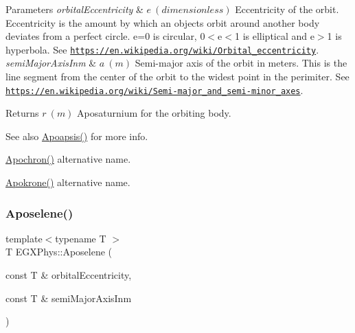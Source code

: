 \begin{DoxyParams}{Parameters}
{\em orbital\+Eccentricity} & $ e\ (dimensionless)$ Eccentricity of the orbit. Eccentricity is the amount by which an objects orbit around another body deviates from a perfect circle. e=0 is circular, 0$<$e$<$1 is elliptical and e$>$1 is hyperbola. See \href{https://en.wikipedia.org/wiki/Orbital_eccentricity}{\tt https\+://en.\+wikipedia.\+org/wiki/\+Orbital\+\_\+eccentricity}. \\
\hline
{\em semi\+Major\+Axis\+Inm} & $ a\ (m)$ Semi-\/major axis of the orbit in meters. This is the line segment from the center of the orbit to the widest point in the perimiter. See \href{https://en.wikipedia.org/wiki/Semi-major_and_semi-minor_axes}{\tt https\+://en.\+wikipedia.\+org/wiki/\+Semi-\/major\+\_\+and\+\_\+semi-\/minor\+\_\+axes}. \\
\hline
\end{DoxyParams}
\begin{DoxyReturn}{Returns}
$ r\ (m)$ Aposaturnium for the orbiting body. 
\end{DoxyReturn}
\begin{DoxySeeAlso}{See also}
\mbox{\hyperlink{group___e_g_x_phys-_apoapsis_gafd08a2d1d64886e7bb9bcb7ff65bc3ea}{Apoapsis()}} for more info. 

\mbox{\hyperlink{group___e_g_x_phys-_apoapsis_gac978de20a08121198f73637018c80eee}{Apochron()}} alternative name. 

\mbox{\hyperlink{group___e_g_x_phys-_apoapsis_ga572bf783c39ce472a06e89063f1fd1a7}{Apokrone()}} alternative name. 
\end{DoxySeeAlso}
\mbox{\label{group___e_g_x_phys-_apoapsis_gaf13528a3ed48f6e85f4ba5735edc1163}} 
\subsubsection{\texorpdfstring{Aposelene()}{Aposelene()}}
{\footnotesize\ttfamily template$<$typename T $>$ \\
T E\+G\+X\+Phys\+::\+Aposelene (\begin{DoxyParamCaption}\item[{const T \&}]{orbital\+Eccentricity,  }\item[{const T \&}]{semi\+Major\+Axis\+Inm }\end{DoxyParamCaption})}



